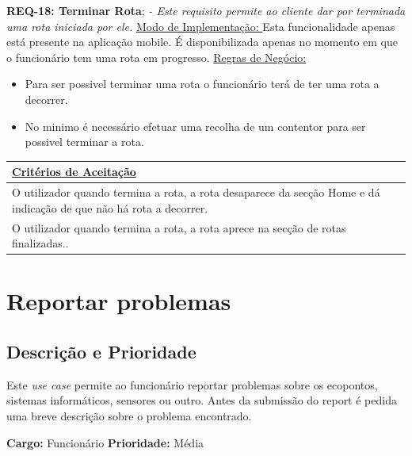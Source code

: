 \documentclass{scrreprt}
\begin{document}
		
	\textbf{REQ-18: Terminar Rota};\newline
	\textit{- Este requisito permite ao cliente dar por terminada uma rota iniciada por ele.}
	 \newline\newline
	\underline{Modo de Implementação: }Esta funcionalidade apenas está presente na aplicação mobile. É disponibilizada apenas no momento em que o funcionário tem uma rota em progresso.  \newline\newline
	\underline{Regras de Negócio: }
		\begin{itemize}
		\item Para ser possivel terminar uma rota o funcionário terá de ter uma rota a decorrer.
		\item No minimo é necessário efetuar uma recolha de um contentor para ser possivel terminar a rota.
	\end{itemize}
	
	\begin{tabular}{|p{5.8in}|p{0.7in}|} \hline 
	\underline{Critérios de Aceitação} \\ \hline 
	O utilizador quando termina a rota, a rota desaparece da secção Home e dá indicação de que não há rota a decorrer. \\ \hline
	O utilizador quando termina a rota, a rota aprece na secção de rotas finalizadas..\\ \hline
	\end{tabular}\newline\newline
	
	\section{Reportar problemas}
	
	\subsection{Descrição e Prioridade}
	
	Este \textit{use case} permite ao funcionário reportar problemas sobre os ecopontos, sistemas informáticos, sensores ou outro. Antes da submissão do report é pedida uma breve descrição sobre o problema encontrado.
	
	\textbf{Cargo: }Funcionário  \newline
	\textbf{Prioridade: }Média \newline
	
\end{document}
